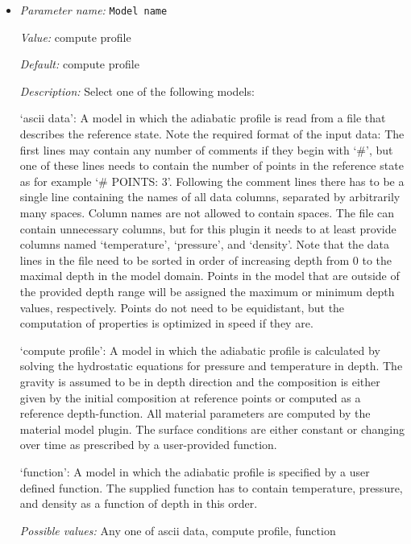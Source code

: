 \begin{itemize}
\item {\it Parameter name:} {\tt Model name}
\label{parameters:Adiabatic conditions model/Model name}
\label{parameters:Adiabatic_20conditions_20model/Model_20name}


{\it Value:} compute profile


{\it Default:} compute profile


{\it Description:} Select one of the following models:

`ascii data': A model in which the adiabatic profile is read from a file that describes the reference state. Note the required format of the input data: The first lines may contain any number of comments if they begin with `#', but one of these lines needs to contain the number of points in the reference state as for example `# POINTS: 3'. Following the comment lines there has to be a single line containing the names of all data columns, separated by arbitrarily many spaces. Column names are not allowed to contain spaces. The file can contain unnecessary columns, but for this plugin it needs to at least provide columns named `temperature', `pressure', and `density'. Note that the data lines in the file need to be sorted in order of increasing depth from 0 to the maximal depth in the model domain. Points in the model that are outside of the provided depth range will be assigned the maximum or minimum depth values, respectively. Points do not need to be equidistant, but the computation of properties is optimized in speed if they are.

`compute profile': A model in which the adiabatic profile is calculated by solving the hydrostatic equations for pressure and temperature in depth. The gravity is assumed to be in depth direction and the composition is either given by the initial composition at reference points or computed as a reference depth-function. All material parameters are computed by the material model plugin. The surface conditions are either constant or changing over time as prescribed by a user-provided function.

`function': A model in which the adiabatic profile is specified by a user defined function. The supplied function has to contain temperature, pressure, and density as a function of depth in this order.


{\it Possible values:} Any one of ascii data, compute profile, function
\end{itemize}




